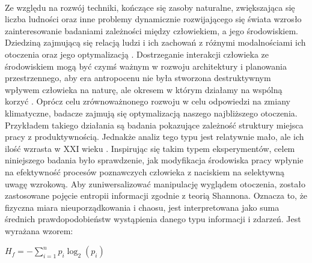 \documentclass[12pt,a4paper,final,oneside,onecolumn,titlepage]{article}
\begin{document}
\paragraph{}
Ze względu na rozwój techniki, kończące się zasoby naturalne, zwiększająca się liczba ludności oraz inne problemy dynamicznie rozwijającego się świata wzrosło zainteresowanie badaniami zależności między człowiekiem, a jego środowiskiem. Dziedziną zajmującą się relacją ludzi i ich zachowań z różnymi modalnościami ich otoczenia oraz jego optymalizacją \citep{banka_psychologia_2018, gifford_environmental_2011}. Dostrzeganie interakcji człowieka ze środowiskiem mogą być czymś ważnym w rozwoju architektury i planowania przestrzennego, aby era antropocenu nie była stworzona destruktywnym wpływem człowieka na naturę, ale okresem w którym działamy na wspólną korzyć \citep{zalasiewicz_new_2010}. Oprócz celu zrównoważnonego rozwoju w celu odpowiedzi na zmiany klimatyczne, badacze zajmują się optymalizacją naszego najbliższego otoczenia. Przykładem takiego działania są badania \citet{lohr_interior_1996} pokazujące zależność struktury miejsca pracy z produktywnością. Jednakże analiz tego typu jest relatywnie mało, ale ich ilość wzrasta w XXI wieku \citep{spano_human_2020}. Inspirując się takim typem eksperymentów, celem niniejszego badania było sprawdzenie, jak modyfikacja środowiska pracy wpłynie na efektywność procesów poznawczych człowieka z naciskiem na selektywną uwagę wzrokową. Aby zuniwersalizować manipulację wyglądem otoczenia, zostało zastosowane pojęcie entropii informacji zgodnie z teorią Shannona. Oznacza to, że fizyczna miara nieuporządkowania i chaosu, jest interpretowana jako suma średnich prawdopodobieństw wystąpienia danego typu informacji i zdarzeń. Jest wyrażana wzorem:
\begin{center}
\begin{math}
H_f=-\displaystyle\sum_{i=1}^{n}p_i\log_2({p_i})
\end{math}
\end{center}
\end{document}
